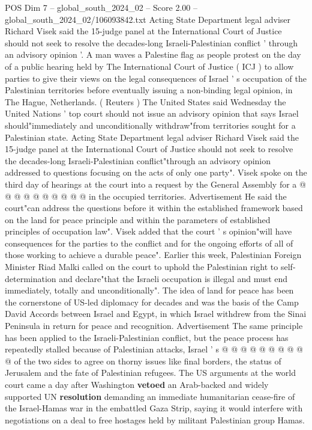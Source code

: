 \begin{textsample}{POS Dim 7 – global\_south\_2024\_02 – Score 2.00 – global\_south\_2024\_02/106093842.txt}  \label{ex:f7_pos_056}
Acting State Department legal adviser Richard Visek said the 15-judge panel at the International Court of Justice should not seek to resolve the decades-long Israeli-Palestinian conflict ' through an advisory opinion '.
A man waves a Palestine flag as people protest on the day of a public hearing held by The International Court of Justice ( ICJ ) to allow parties to give their views on the legal consequences of Israel ' s occupation of the Palestinian territories before eventually issuing a non-binding legal opinion, in The Hague, Netherlands. ( Reuters ) The United States said Wednesday the United Nations ' top court should not issue an advisory opinion that says Israel should"immediately and unconditionally withdraw"from territories sought for a Palestinian state.
Acting State Department legal adviser Richard Visek said the 15-judge panel at the International Court of Justice should not seek to resolve the decades-long Israeli-Palestinian conflict"through an advisory opinion addressed to questions focusing on the acts of only one party".
Visek spoke on the third day of hearings at the court into a request by the General Assembly for a @ @ @ @ @ @ @ @ @ @ in the occupied territories.
Advertisement He said the court"can address the questions before it within the established framework based on the land for peace principle and within the parameters of established principles of occupation law".
Visek added that the court ' s opinion"will have consequences for the parties to the conflict and for the ongoing efforts of all of those working to achieve a durable peace".
Earlier this week, Palestinian Foreign Minister Riad Malki called on the court to uphold the Palestinian right to self-determination and declare"that the Israeli occupation is illegal and must end immediately, totally and unconditionally".
The idea of land for peace has been the cornerstone of US-led diplomacy for decades and was the basis of the Camp David Accords between Israel and Egypt, in which Israel withdrew from the Sinai Peninsula in return for peace and recognition.
Advertisement The same principle has been applied to the Israeli-Palestinian conflict, but the peace process has repeatedly stalled because of Palestinian attacks, Israel ' s @ @ @ @ @ @ @ @ @ @ of the two sides to agree on thorny issues like final borders, the status of Jerusalem and the fate of Palestinian refugees.
The US arguments at the world court came a day after Washington \textbf{vetoed} an Arab-backed and widely supported UN \textbf{resolution} demanding an immediate humanitarian cease-fire of the Israel-Hamas war in the embattled Gaza Strip, saying it would interfere with negotiations on a deal to free hostages held by militant Palestinian group Hamas.

\end{textsample}
